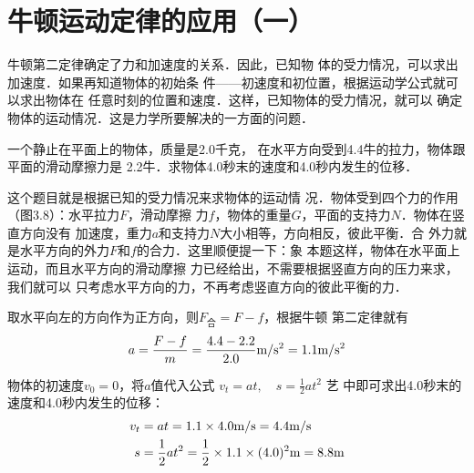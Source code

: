 \section{牛顿运动定律的应用（一）}
    牛顿第二定律确定了力和加速度的关系．因此，已知物
体的受力情况，可以求出加速度．如果再知道物体的初始条
件——初速度和初位置，根据运动学公式就可以求出物体在
任意时刻的位置和速度．这样，已知物体的受力情况，就可以
确定物体的运动情况．这是力学所要解决的一方面的问题．

\begin{example}
一个静止在平面上的物体，质量是2.0千克，
在水平方向受到4.4牛的拉力，物体跟平面的滑动摩擦力是
2.2牛．求物体4.0秒末的速度和4.0秒内发生的位移．
\end{example}

\begin{figure}[htp]\centering
{}
\caption{}
\end{figure}

\begin{solution}
这个题目就是根据已知的受力情况来求物体的运动情
况．物体受到四个力的作用（图3.8）：水平拉力$F$，滑动摩擦
力$f$，物体的重量$G$，平面的支持力$N$．物体在竖直方向没有
加速度，重力$a$和支持力$N$大小相等，方向相反，彼此平衡．合
外力就是水平方向的外力$F$和$f$的合力．这里顺便提一下：象
本题这样，物体在水平面上运动，而且水平方向的滑动摩擦
力已经给出，不需要根据竖直方向的压力来求，我们就可以
只考虑水平方向的力，不再考虑竖直方向的彼此平衡的力．



    取水平向左的方向作为正方向，则$F_{\text{合}}=F-f$，根据牛顿
第二定律就有
\[a=\frac{F-f}{m}=\frac{4.4-2.2}{2.0}\text{m}/\text{s}^2=1.1\text{m}/\text{s}^2 \]
 
 物体的初速度$v_0=0$，将$a$值代入公式
$v_t=at,\quad s=\frac{1}{2}at^2$                                                                                                    艺
中即可求出4.0秒末的速度和4.0秒内发生的位移：
\[\begin{split}
v_t&=at=1.1\times 4.0\text{m}/\text{s} =4.4\text{m}/\text{s}\\
s&=\frac{1}{2}at^2=\frac{1}{2}\times 1.1\times (4.0)^2 {\rm m}=8.8{\rm m}
\end{split} \]
\end{solution}

